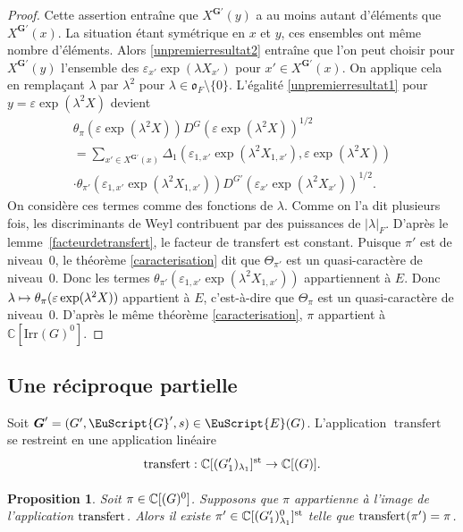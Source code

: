 \documentclass[JEP,XML,SOM,Unicode,francais]{cedram}
\let\mathcal \EuScript
\newcommand{\NoChangel}[1]{%
\expandafter\let\csname old\string#1\endcsname=#1
\let#1=\relax
\newcommand{#1}{\mathcode`l="716C\csname old\string#1\endcsname\mathcode`l="7160 }%
}
\let\epsilon\varepsilon
\newcommand\mto{\mathchoice{\longmapsto}{\mapsto}{\mapsto}{\mapsto}}
\newcommand{\fro}{\mathfrak{o}}
\newcommand{\rell}{\mathrm{ell}} \NoChangel{\rell}
\newcommand{\Ell}{\mathrm{Ell}} \NoChangel{\Ell}
\newcommand{\Irr}{\mathrm{Irr}}
\newcommand{\st}{\mathrm{st}}
\DeclareMathOperator{\transfert}{transfert}
\newcommand{\bG}{\boldsymbol{G}}
\newcommand{\cE}{\mathcal{E}}
\newcommand{\cG}{\mathcal{G}}
\newcommand{\CC}{\mathbb{C}}
\theoremstyle{plain}
\newtheorem*{prop*}{Proposition}
\theoremstyle{definition}
\begin{document}
\begin{proof}
Cette assertion entraîne que $X^{\bG'}(y)$ a au moins autant d'éléments que $X^{\bG'}(x)$. La situation étant symétrique en $x$ et $y$, ces ensembles ont même nombre d'éléments. Alors \eqref{unpremierresultat2} entraîne que l'on peut choisir pour $X^{\bG'}(y)$ l'ensemble des $\epsilon_{x'}\exp(\lambda X_{x'})$ pour $x'\in X^{\bG'}(x)$. On applique cela en remplaçant $\lambda$ par $\lambda^2$ pour $\lambda\in \fro_{F}\setminus\{0\}$. L'égalité \eqref{unpremierresultat1} pour $y=\epsilon \exp(\lambda^2 X)$ devient
\begin{multline*}\tag{3}\label{unpremierresultat3}
\theta_{\pi}(\epsilon \exp(\lambda^2X))D^G(\epsilon \exp(\lambda^2 X))^{1/2}\\[-3pt]
=\sum_{x'\in X^{\bG'}(x)}\Delta_{1}(\epsilon_{1,x'}\exp(\lambda^2X_{1,x'}),\epsilon \exp(\lambda^2X))
\\[-10pt]
\cdot\theta_{\pi'}(\epsilon_{1,x'}\exp(\lambda^2X_{1,x'}))D^{G'}(\epsilon_{x'}\exp(\lambda^2X_{x'}))^{1/2}.
\end{multline*}
On considère ces termes comme des fonctions de $\lambda$. Comme on l'a dit plusieurs fois, les discriminants de Weyl contribuent par des puissances de $\vert \lambda\vert _{F}$. D'après le lemme~\ref{facteurdetransfert}, le facteur de transfert est constant. Puisque $\pi'$ est de niveau~$0$, le théorème \ref{caracterisation} dit que $\Theta_{\pi'}$ est un quasi-caractère de niveau~$0$. Donc les termes $\theta_{\pi'}(\epsilon_{1,x'}\exp(\lambda^2X_{1,x'}))$ appartiennent à $E$. Donc $\lambda\mto \theta_{\pi}(\epsilon \exp(\lambda^2X))$ appartient à $E$, c'est-à-dire que $\Theta_{\pi}$ est un quasi-caractère de niveau~$0$. D'après le même théorème \ref{caracterisation}, $\pi$ appartient à $\CC[\Irr(G)^0]$.
\end{proof}

\subsection{Une réciproque partielle}\label{unereciproque}
Soit $\bG'=(G',\cG',s)\in \cE(G)$.
L'application $\transfert$ se restreint en une application linéaire
\[
\transfert_{\rell}:\CC[\Ell(G'_{1})_{\lambda_{1}}]^{\st}\to \CC[\Ell(G)].
\]
\begin{prop*}
Soit $\pi\in \CC[\Ell(G)^0]$. Supposons que $\pi$ appartienne à l'image de l'application $\transfert_{\rell}$. Alors il existe $\pi'\in \CC[\Ell(G'_{1})^0_{\lambda_{1}}]^{\st}$ telle que $\transfert_{\rell}(\pi')=\pi$.
\end{prop*}
\end{document}
